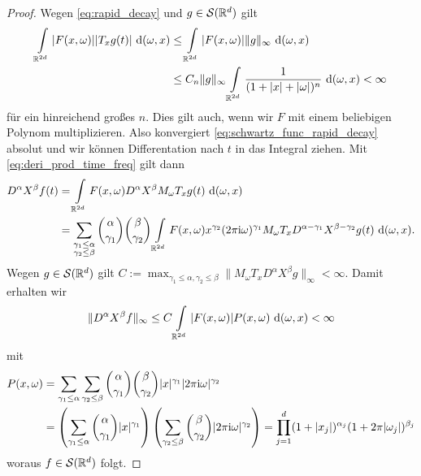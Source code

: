 \begin{proof}
	Wegen \eqref{eq:rapid_decay} und $ g \in \mathcal{S}(\mathbb{R}^d) $ gilt
	\begin{align*}
	\int \limits_{\mathbb{R}^{2d}} |F(x,\omega)| |T_x g(t) | \text{ d} (\omega,x)
	&\leq 
	\int \limits_{\mathbb{R}^{2d}} | F(x,\omega) | \| g \|_\infty \text{ d} (\omega,x)\\
	&\leq
	C_n \|g \|_\infty 
	\int \limits_{\mathbb{R}^{2d}} \frac{1}{(1+ |x| +|\omega|)^n } \text{ d} (\omega,x) < \infty
	\end{align*}
	für ein hinreichend großes $ n $. Dies gilt auch, wenn wir $ F  $ mit einem beliebigen Polynom multiplizieren. Also konvergiert \eqref{eq:schwartz_func_rapid_decay} absolut und wir können Differentation nach $ t $ in das Integral ziehen.
	Mit \eqref{eq:deri_prod_time_freq} gilt dann
	\begin{align*}
	D^\alpha X^\beta f(t)
	&=
	\int \limits_{\mathbb{R}^{2d}} F(x, \omega) D^\alpha X^\beta M_\omega T_x g(t) \text{ d} (\omega,x)\\
	&=
	\sum \limits_{
		\substack{\gamma_1 \leq \alpha \\ \gamma_2 \leq \beta}
		}
	\binom{\alpha}{\gamma_1} \binom{\beta}{\gamma_2}
	\int \limits_{\mathbb{R}^{2d}} F(x,\omega) x^{\gamma_2} (2 \pi \textrm{i} \omega)^{\gamma_1}
	M_\omega T_x D^{\alpha - \gamma_1} X^{\beta - \gamma_2} g(t)\text{ d} (\omega,x).
	\end{align*}
	Wegen $ g \in \mathcal{S}(\mathbb{R}^d) $ gilt $ C := \max_{\gamma_1 \leq  \alpha, \gamma_2 \leq \beta} \| M_\omega T_x D^\alpha X^\beta  g \|_\infty < \infty  $.
	Damit erhalten wir
	\begin{align}\label{eq:estimate_rapid_decay}
	\| D^\alpha X^\beta f \|_\infty
	\leq
	C\int \limits_{\mathbb{R}^{2d}} |F(x, \omega) | P(x,\omega) \text{ d} (\omega,x) < \infty
	\end{align}
	mit
	\begin{equation}
	\begin{split}
	P(x,\omega)
	&= \sum 
	\limits_{\gamma_1 \leq \alpha}
	\sum \limits_{\gamma_2 \leq \beta }
	\binom{\alpha}{\gamma_1} \binom{\beta}{\gamma_2}
	|x|^{\gamma_1}|2\pi \textrm{i} \omega|^{\gamma_2}\\
	&=
	\left( \sum 
	\limits_{\gamma_1 \leq \alpha} \binom{\alpha}{\gamma_1} |x|^{\gamma_1} \right)
	\left(\sum \limits_{\gamma_2 \leq \beta } \binom{\beta}{\gamma_2} |2\pi \textrm{i} \omega|^{\gamma_2} \right)
	=
	\prod \limits_{j=1}^d (1+ |x_j|)^{\alpha_j} (1+ 2\pi |\omega_j|)^{\beta_j}
	\end{split}
	\end{equation}
	woraus $ f \in \mathcal{S}(\mathbb{R}^d) $ folgt.
\end{proof}

